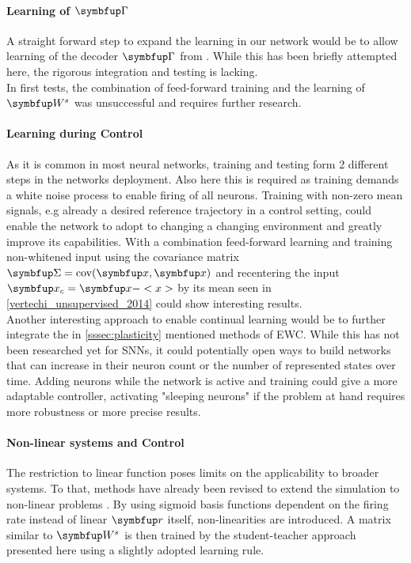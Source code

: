 \paragraph{Learning of $\bmu{\Gamma}$}
A straight forward step to expand the learning in our network would be to allow learning of the decoder $\bmu{\Gamma}$ from \cite{brendel_learning_2020}. While this has been briefly attempted here, the rigorous integration and testing is lacking.\\
In first tests, the combination of feed-forward training and the learning of $\bmu{W}^s$ was unsuccessful and requires further research.
\paragraph{Learning during Control}
As it is common in most neural networks, training and testing form 2 different steps in the networks deployment. Also here this is required as training demands a white noise process to enable firing of all neurons. Training with non-zero mean signals, e.g already a desired reference trajectory in a control setting, could enable the network to adopt to changing a changing environment and greatly improve its capabilities. With a combination feed-forward learning and training non-whitened input using the covariance matrix $\bmu{\Sigma} = \text{cov}(\bmu{x},\bmu{x})$ and recentering the input $\bmu{x
}_c = \bmu{x} - <x>$ by its mean seen in \cref{vertechi_unsupervised_2014} could show interesting results.\\
Another interesting approach to enable continual learning would be to further integrate the in \cref{sssec:plasticity} mentioned methods of \ac{EWC}. While this has not been researched yet for \acp{SNN}, it could potentially open ways to build networks that can increase in their neuron count or the number of represented states over time. Adding neurons while the network is active and training could give a more adaptable controller, activating "sleeping neurons" if the problem at hand requires more robustness or more precise results.\\

\paragraph{Non-linear systems and Control}
The restriction to linear function poses limits on the applicability to broader systems. To that, methods have already been revised to extend the simulation to non-linear problems \cite{alemi_learning_2017}. By using sigmoid basis functions dependent on the firing rate instead of linear $\bmu{r}$ itself, non-linearities are introduced. A matrix similar to $\bmu{W}^s$ is then trained by the student-teacher approach presented here using a slightly adopted learning rule.
